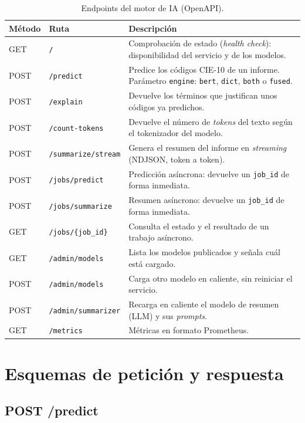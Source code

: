 \begin{table}[h]
\centering
\small
\caption{Endpoints del motor de IA (OpenAPI).}
\label{tab:openapi-endpoints}
\begin{tabular}{llp{7.2cm}}
\hline
\textbf{Método} & \textbf{Ruta} & \textbf{Descripción} \\
\hline
GET & \texttt{/} & Comprobación de estado (\emph{health check}): disponibilidad del servicio y de los modelos. \\
POST & \texttt{/predict} & Predice los códigos CIE-10 de un informe. Parámetro \texttt{engine}: \texttt{bert}, \texttt{dict}, \texttt{both} o \texttt{fused}. \\
POST & \texttt{/explain} & Devuelve los términos que justifican unos códigos ya predichos. \\
POST & \texttt{/count-tokens} & Devuelve el número de \emph{tokens} del texto según el tokenizador del modelo. \\
POST & \texttt{/summarize/stream} & Genera el resumen del informe en \emph{streaming} (NDJSON, token a token). \\
POST & \texttt{/jobs/predict} & Predicción asíncrona: devuelve un \texttt{job\_id} de forma inmediata. \\
POST & \texttt{/jobs/summarize} & Resumen asíncrono: devuelve un \texttt{job\_id} de forma inmediata. \\
GET & \texttt{/jobs/\{job\_id\}} & Consulta el estado y el resultado de un trabajo asíncrono. \\
GET & \texttt{/admin/models} & Lista los modelos publicados y señala cuál está cargado. \\
POST & \texttt{/admin/models} & Carga otro modelo en caliente, sin reiniciar el servicio. \\
POST & \texttt{/admin/summarizer} & Recarga en caliente el modelo de resumen (LLM) y sus \emph{prompts}. \\
GET & \texttt{/metrics} & Métricas en formato Prometheus. \\
\hline
\end{tabular}
\end{table}

\section{Esquemas de petición y respuesta}

\subsection{POST /predict}

